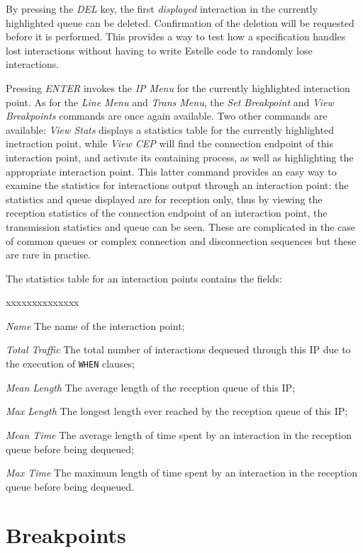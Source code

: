 By pressing the {\em DEL} key, the first {\em displayed} interaction
in the currently highlighted queue can be deleted. Confirmation of
the deletion will be requested before it is performed. This provides
a way to test how a specification handles lost interactions without
having to write Estelle code to randomly lose interactions.

Pressing {\em ENTER} invokes the {\em IP Menu} for the currently
highlighted interaction point. As for the {\em Line Menu} and {\em
Trans Menu}, the {\em Set Breakpoint} and {\em View Breakpoints}
commands are once again available. Two other commands are available:
{\em View Stats} displays a statistics table for the currently
highlighted inetraction point, while {\em View CEP} will find the
connection endpoint of this interaction point, and activate its
containing process, as well as highlighting the appropriate
interaction point. This latter command provides an easy way to
examine the statistics for interactions output through an interaction
point: the statistics and queue displayed are for reception only,
thus by viewing the reception statistics of the connection endpoint of
an interaction point, the transmission statistics and queue can be
seen. These are complicated in the case of common queues or complex
connection and disconnection sequences but these are rare in
practise.

The statistics table for an interaction points contains the fields:
\begin{describe}{xxxxxxxxxxxxxx}
\item[\em Name]The name of the interaction point;
\item[\em Total Traffic]The total number of interactions dequeued
through this IP due to the execution of {\tt WHEN} clauses;
\item[\em Mean Length]The average length of the reception queue of
this IP;
\item[\em Max Length]The longest length ever reached by the
reception queue of this IP;
\item[\em Mean Time]The average length of time spent by an
interaction in the reception queue before being dequeued;
\item[\em Max Time]The maximum length of time spent by an
interaction in the reception queue before being dequeued.
\end{describe}

\newpage
\section[Breakpoints]{Breakpoints}
\label{brkpt-sec}

